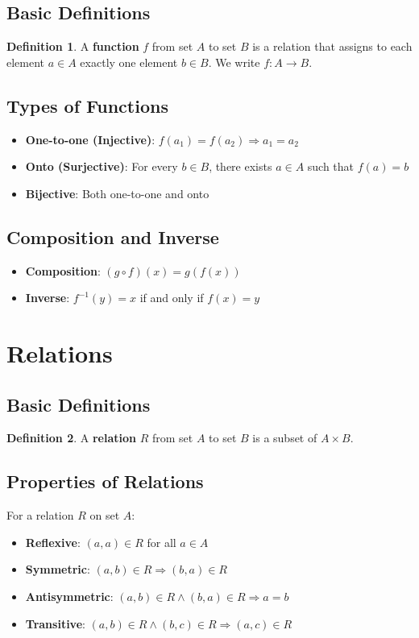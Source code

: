 \documentclass[11pt]{article}
\theoremstyle{definition}
\newtheorem{definition}{Definition}[section]
\begin{document}
\subsection{Basic Definitions}
\begin{definition}
A \textbf{function} $f$ from set $A$ to set $B$ is a relation that assigns to each element $a \in A$ exactly one element $b \in B$. We write $f: A \rightarrow B$.
\end{definition}

\subsection{Types of Functions}
\begin{itemize}
    \item \textbf{One-to-one (Injective)}: $f(a_1) = f(a_2) \Rightarrow a_1 = a_2$
    \item \textbf{Onto (Surjective)}: For every $b \in B$, there exists $a \in A$ such that $f(a) = b$
    \item \textbf{Bijective}: Both one-to-one and onto
\end{itemize}

\subsection{Composition and Inverse}
\begin{itemize}
    \item \textbf{Composition}: $(g \circ f)(x) = g(f(x))$
    \item \textbf{Inverse}: $f^{-1}(y) = x$ if and only if $f(x) = y$
\end{itemize}

\section{Relations}

\subsection{Basic Definitions}
\begin{definition}
A \textbf{relation} $R$ from set $A$ to set $B$ is a subset of $A \times B$.
\end{definition}

\subsection{Properties of Relations}
For a relation $R$ on set $A$:
\begin{itemize}
    \item \textbf{Reflexive}: $(a,a) \in R$ for all $a \in A$
    \item \textbf{Symmetric}: $(a,b) \in R \Rightarrow (b,a) \in R$
    \item \textbf{Antisymmetric}: $(a,b) \in R \land (b,a) \in R \Rightarrow a = b$
    \item \textbf{Transitive}: $(a,b) \in R \land (b,c) \in R \Rightarrow (a,c) \in R$
\end{itemize}
\end{document}
